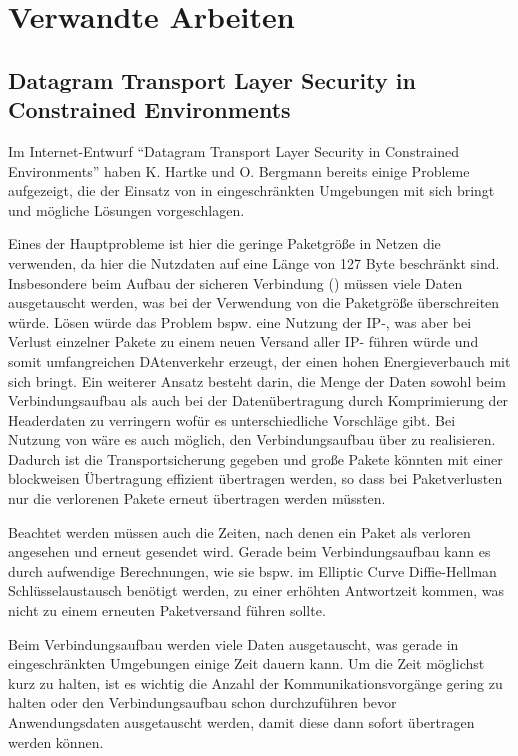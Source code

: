 \section{Verwandte Arbeiten}

\subsection{Datagram Transport Layer Security in Constrained Environments}
Im Internet-Entwurf "`Datagram Transport Layer Security in Constrained Environments"' \cite{draftcodtls} haben K. Hartke und O. Bergmann
bereits einige Probleme aufgezeigt, die der Einsatz von  in eingeschränkten Umgebungen mit sich bringt und mögliche Lösungen vorgeschlagen.

Eines der Hauptprobleme ist hier die geringe Paketgröße in Netzen die  verwenden, da hier die Nutzdaten auf eine Länge von 127 Byte beschränkt sind.
Insbesondere beim Aufbau der sicheren Verbindung () müssen viele Daten ausgetauscht werden, was bei der Verwendung von  die Paketgröße
überschreiten würde. Lösen würde das Problem bspw. eine Nutzung der IP-, was aber bei Verlust einzelner Pakete zu einem neuen Versand aller
IP- führen würde und somit umfangreichen DAtenverkehr erzeugt, der einen hohen Energieverbauch mit sich bringt. Ein weiterer Ansatz besteht darin,
die Menge der Daten sowohl beim Verbindungsaufbau als auch bei der Datenübertragung durch Komprimierung der Headerdaten zu verringern wofür es unterschiedliche
Vorschläge gibt. Bei Nutzung von  wäre es auch möglich, den Verbindungsaufbau über  zu realisieren. Dadurch ist die Transportsicherung gegeben
und große Pakete könnten mit einer blockweisen Übertragung effizient übertragen werden, so dass bei Paketverlusten nur die verlorenen Pakete erneut übertragen werden
müssten.

Beachtet werden müssen auch die Zeiten, nach denen ein Paket als verloren angesehen und erneut gesendet wird. Gerade beim Verbindungsaufbau
kann es durch aufwendige Berechnungen, wie sie bspw. im Elliptic Curve Diffie-Hellman Schlüsselaustausch benötigt werden, zu einer erhöhten
Antwortzeit kommen, was nicht zu einem erneuten Paketversand führen sollte.

Beim Verbindungsaufbau werden viele Daten ausgetauscht, was gerade in eingeschränkten Umgebungen einige Zeit dauern kann. Um die Zeit
möglichst kurz zu halten, ist es wichtig die Anzahl der Kommunikationsvorgänge gering zu halten oder den Verbindungsaufbau schon durchzuführen
bevor Anwendungsdaten ausgetauscht werden, damit diese dann sofort übertragen werden können.

